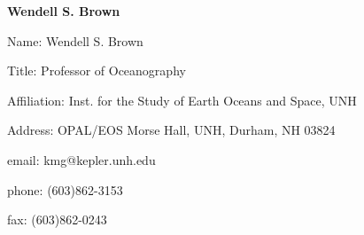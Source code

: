 \begin{center}
\LARGE
{\bf  Wendell S. Brown}
\end{center}
\large
{}
\normalsize
\smallskip
\begin{description}
\item{Name:}  Wendell S. Brown
\item{Title:}  Professor of Oceanography
\item{Affiliation:}  Inst. for the Study of Earth Oceans and Space, UNH
\item{Address:}  OPAL/EOS Morse Hall, UNH, Durham, NH  03824
\item{email:}  kmg@kepler.unh.edu
\item{phone:}  (603)862-3153
\item{fax:}  (603)862-0243
\end{description}
\medskip
\large
{}
\normalsize
\medskip
